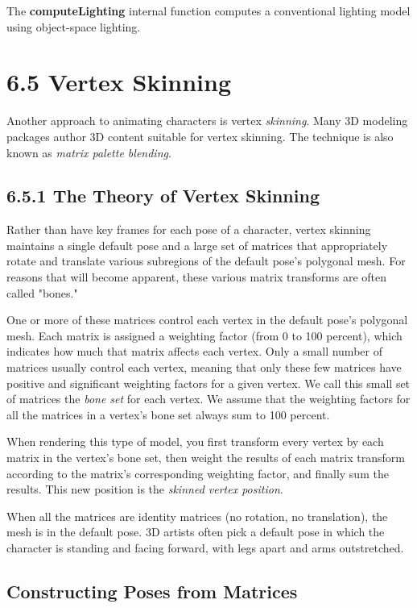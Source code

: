 \documentclass[../main.tex]{subfiles}
\begin{document}
The \textbf{computeLighting} internal function computes a conventional lighting model using object-space lighting.

\section{6.5 Vertex Skinning}

Another approach to animating characters is vertex \textit{skinning}. Many 3D modeling packages author 3D content suitable for vertex skinning. The technique is also known as \textit{matrix palette blending}.

\subsection{6.5.1 The Theory of Vertex Skinning}

Rather than have key frames for each pose of a character, vertex skinning maintains a single default pose and a large set of matrices that appropriately rotate and translate various subregions of the default pose's polygonal mesh. For reasons that will become apparent, these various matrix transforms are often called "bones."

One or more of these matrices control each vertex in the default pose's polygonal mesh. Each matrix is assigned a weighting factor (from 0 to 100 percent), which indicates how much that matrix affects each vertex. Only a small number of matrices usually control each vertex, meaning that only these few matrices have positive and significant weighting factors for a given vertex. We call this small set of matrices the \textit{bone set} for each vertex. We assume that the weighting factors for all the matrices in a vertex's bone set always sum to 100 percent.

When rendering this type of model, you first transform every vertex by each matrix in the vertex's bone set, then weight the results of each matrix transform according to the matrix's corresponding weighting factor, and finally sum the results. This new position is the \textit{skinned vertex position}.

When all the matrices are identity matrices (no rotation, no translation), the mesh is in the default pose. 3D artists often pick a default pose in which the character is standing and facing forward, with legs apart and arms outstretched.

\subsection*{Constructing Poses from Matrices}
\end{document}
